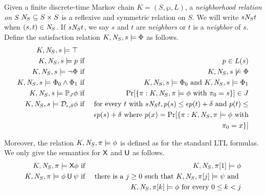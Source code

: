 
Given a finite discrete-time Markov chain $K = (S, \wp, L)$, a
\emph{neighborhood relation on $S$} $\mathit{N}_{S} \subseteq S \times S$
is a reflexive and symmetric relation on $S$. We will write $s
\mathit{N}_{S} t$ when $(s, t) \in \mathit{N}_{S}$. If $s \mathit{N}_{S} t$,
we say $s$ and $t$ are \emph{neighbors} or $t$ is a \emph{neighbor} of
$s$. Define the satisfaction relation $K, \mathit{N}_{S}, s
\models \Phi$ as follows.
\begin{eqnarray*}
  K, \mathit{N}_{S}, s \models \top\\
  K, \mathit{N}_{S}, s \models p
  & \textmd{ if } &
  p \in L(s)\\
  K, \mathit{N}_{S}, s \models \neg \Phi
  & \textmd{ if } &
  K, \mathit{N}_{S}, s \not\models \Phi\\
  K, \mathit{N}_{S}, s \models \Phi_0 \wedge \Phi_1
  & \textmd{ if } &
  K, \mathit{N}_{S}, s \models \Phi_0 \textmd{ and }
  K, \mathit{N}_{S}, s \models \Phi_1\\
  K, \mathit{N}_{S}, s \models \mathbb{P}_{J} \phi
  & \textmd{ if } &
  \Pr [\{ \pi : K, \mathit{N}_{S}, \pi \models \phi \textmd{ with }
                    \pi_0 = s\}] \in J \\
  K, \mathit{N}_{S}, s \models \mathcal{D}_{{\epsilon}, {\delta}} \phi
  & \textmd{ if } &
  \textmd{for every } t \textmd{ with }  s \mathit{N}_{S} t,
      p(s) \leq \epsilon p(t) + \delta \textmd{ and }
      p(t) \leq \\
  & & \epsilon p(s)  + \delta  \textmd{ where } p(x) = \Pr [\{
      \pi : K, \mathit{N}_{S}, \pi \models \phi \textmd{ with}\\
  & &  \pi_0 = x \}]
\end{eqnarray*}

Moreover, the relation $K, \mathit{N}_{S}, \pi \models \phi$ is defined as
for the standard LTL formulas. We only give the semantics for $\mathsf{X}$ and $\mathbin{\mathsf{U}}$ as follows.
\begin{eqnarray*}
  K, \neighbor{S}, \pi \models \X \phi
  & \textmd{ if } &
  K, \neighbor{S}, \pi[1] \models \phi\\
  K, \neighbor{S}, \pi \models \phi \until \psi
  & \textmd{ if } &
  \textmd{there is a } j \geq 0 \textmd{ such that }
  K, \neighbor{S}, \pi[j] \models \psi \textmd{ and } \\
  & & K, \neighbor{S}, \pi[k] \models \phi
      \textmd{ for every } 0 \leq k < j
\hide{
  K, \neighbor{S}, \pi \models \Phi \buntil{n} \Psi
  & \textmd{ if } &
  \textmd{there is a } 0 \leq j \leq n \textmd{ such that }
  K, \neighbor{S}, \pi[j] \models \Psi \textmd{ and } \\
  & & K, \neighbor{S}, \pi[k] \models \Phi
      \textmd{ for every } 0 \leq k < j
}
\end{eqnarray*}

